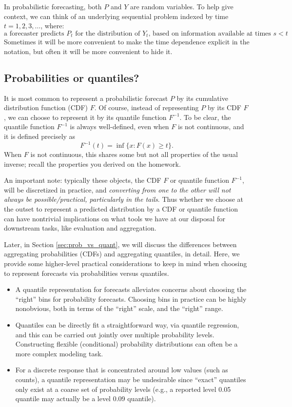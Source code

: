 \documentclass{article}
\begin{document}
In probabilistic forecasting, both $P$ and $Y$ are random variables. To help
give context, we can think of an underlying sequential problem indexed by time
$t=1,2,3,\dots$, where:
\[
\text{a forecaster predicts $P_t$ for the distribution of $Y_t$, based on
  information available at times $s<t$}.
\]
Sometimes it will be more convenient to make the time dependence explicit in the
notation, but often it will be more convenient to hide it. 

\subsection{Probabilities or quantiles?}

It is most common to represent a probabilistic forecast $P$ by its cumulative
distribution function (CDF) $F$. Of course, instead of representing $P$ by its
CDF $F$, we can choose to represent it by its quantile function
$F^{-1}$. To be clear, the quantile function $F^{-1}$ is always well-defined,
even when $F$ is not continuous, and it is defined precisely as
\[
F^{-1}(t) = \inf\{ x : F(x) \geq t\}.
\]
When $F$ is not continuous, this shares some but not all properties of the 
usual inverse; recall the properties you derived on the homework.

An important note: typically these objects, the CDF $F$ or quantile function
$F^{-1}$, will be discretized in practice, and \emph{converting from one to the
  other will not always be possible/practical, particularly in the tails}. Thus
whether we choose at the outset to represent a predicted distribution by a CDF
or quantile function can have nontrivial implications on what tools we have at
our disposal for downstream tasks, like evaluation and aggregation.

Later, in Section \ref{sec:prob_vs_quant}, we will discuss the differences
between aggregating probabilities (CDFs) and aggregating quantiles, in
detail. Here, we provide some higher-level practical considerations to keep in
mind when choosing to represent forecasts via probabilities versus quantiles. 

\begin{itemize}
\item A quantile representation for forecasts alleviates concerns about choosing
  the ``right'' bins for probability forecasts. Choosing bins in practice can be
  highly nonobvious, both in terms of the ``right''  scale, and the ``right''
  range.  

\item Quantiles can be directly fit a straightforward way, via quantile
  regression, and this can be carried out jointly over multiple probability
  levels. Constructing flexible (conditional) probability distributions can
  often be a more complex modeling task.  

\item For a discrete response that is concentrated around low values (such as 
  counts), a quantile representation may be undesirable since ``exact''
  quantiles only exist at a coarse set of probability levels (e.g., a reported
  level 0.05 quantile may actually be a level 0.09 quantile).     
\end{itemize}
\end{document}

